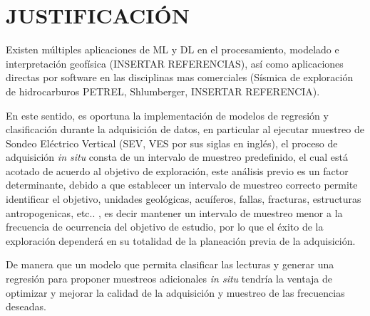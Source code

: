 \chapter{JUSTIFICACIÓN}
Existen múltiples aplicaciones de ML y DL en el procesamiento, modelado e interpretación geofísica (INSERTAR REFERENCIAS), así como aplicaciones directas por software en las disciplinas mas comerciales (Sísmica de exploración de hidrocarburos PETREL, Shlumberger,  INSERTAR REFERENCIA).


En este sentido, es oportuna la implementación de modelos de regresión y clasificación durante la adquisición de datos, en particular al ejecutar muestreo de Sondeo Eléctrico Vertical (SEV, VES por sus siglas en inglés), el proceso de adquisición \textit{in situ} consta de un intervalo de muestreo predefinido, el cual está acotado de acuerdo al objetivo de exploración, este análisis previo es un factor determinante, debido a que establecer un intervalo de muestreo correcto permite identificar el objetivo, unidades geológicas, acuíferos, fallas, fracturas, estructuras antropogenicas, etc.. , es decir mantener un intervalo de muestreo menor a la frecuencia de ocurrencia del objetivo de estudio, por lo que el éxito de la exploración dependerá en su totalidad de la planeación previa de la adquisición.

De manera que un modelo que permita clasificar las lecturas y generar una regresión para proponer muestreos adicionales \textit{in situ} tendría la ventaja de optimizar y mejorar la calidad de la adquisición y muestreo de las frecuencias deseadas.
